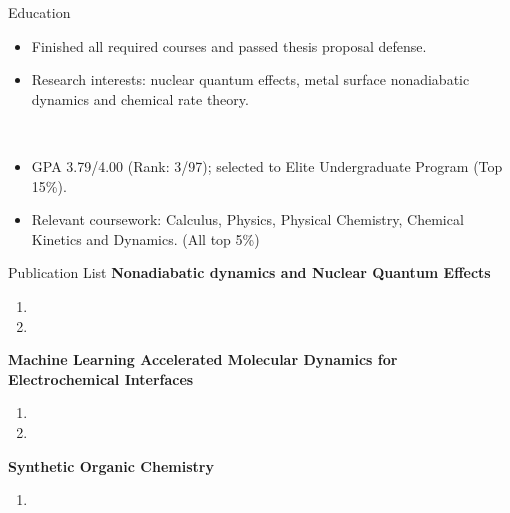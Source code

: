 \documentclass{resume}
\begin{document}
\begin{rSection}{Education}
     \\
    \begin{itemize}[noitemsep, nosep]
        \item Finished all required courses and passed thesis proposal defense.
        \item Research interests: nuclear quantum effects, metal surface nonadiabatic dynamics and chemical rate theory.
    \end{itemize}

     \\
    \begin{itemize}[noitemsep, nosep]
        \item GPA 3.79/4.00 (Rank: 3/97); selected to Elite Undergraduate Program (Top 15\%).
        \item Relevant coursework: Calculus, Physics, Physical Chemistry, Chemical Kinetics and Dynamics. (All top 5\%)
    \end{itemize}
\end{rSection}

\begin{rSection}{Publication List}
    \textbf{Nonadiabatic dynamics and Nuclear Quantum Effects}
    \begin{enumerate}
        \item {}
        \item {}
    \end{enumerate}

    \textbf{Machine Learning Accelerated Molecular Dynamics for Electrochemical Interfaces}
    \begin{enumerate}
        \item {} 
        \item {} 
    \end{enumerate}
    \textbf{Synthetic Organic Chemistry}    
    \begin{enumerate}
        \item {} 
    \end{enumerate}
\end{rSection}
\end{document}
